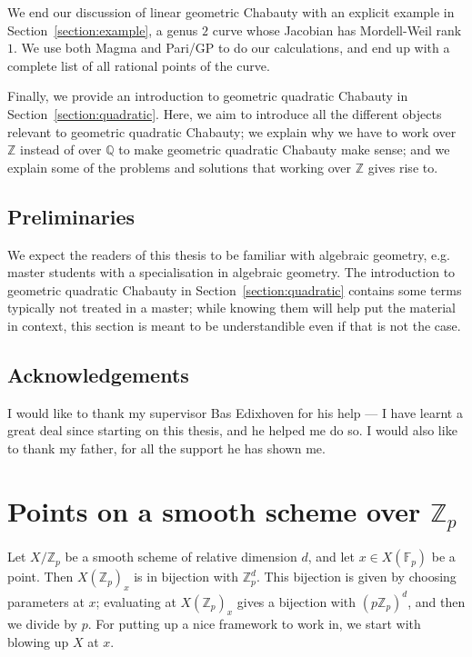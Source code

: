 \documentclass[12pt]{article}
\newcommand{\Z}{\mathbb{Z}}
\newcommand{\Q}{\mathbb{Q}}
\newcommand{\F}{\mathbb{F}}
\theoremstyle{plain}
\theoremstyle{definition}
\theoremstyle{remark}
\begin{document}
We end our discussion of linear geometric Chabauty with an explicit example in Section~\ref{section:example}, a genus $2$ curve whose Jacobian has Mordell-Weil rank $1$. We use both Magma and Pari/GP to do our calculations, and end up with a complete list of all rational points of the curve.

Finally, we provide an introduction to geometric quadratic Chabauty in Section~\ref{section:quadratic}. Here, we aim to introduce all the different objects relevant to geometric quadratic Chabauty; we explain why we have to work over $\Z$ instead of over $\Q$ to make geometric quadratic Chabauty make sense; and we explain some of the problems and solutions that working over $\Z$ gives rise to.

\subsection{Preliminaries}
We expect the readers of this thesis to be familiar with algebraic geometry, e.g. master students with a specialisation in algebraic geometry. The introduction to geometric quadratic Chabauty in Section~\ref{section:quadratic} contains some terms typically not treated in a master; while knowing them will help put the material in context, this section is meant to be understandible even if that is not the case. 

\subsection{Acknowledgements}
I would like to thank my supervisor Bas Edixhoven for his help --- I have learnt a great deal since starting on this thesis, and he helped me do so. I would also like to thank my father, for all the support he has shown me.

\newpage
\section{Points on a smooth scheme over \texorpdfstring{$\Z_p$}{Z\_p}}
\label{section:smoothzppoints}
Let $X/\Z_p$ be a smooth scheme of relative dimension $d$, and let $x \in X(\F_p)$ be a point. Then $X(\Z_p)_x$ is in bijection with $\Z_p^d$. This bijection is given by choosing parameters at $x$; evaluating at $X(\Z_p)_x$ gives a bijection with $(p\Z_p)^d$, and then we divide by $p$. For putting up a nice framework to work in, we start with blowing up $X$ at $x$.
\end{document}
